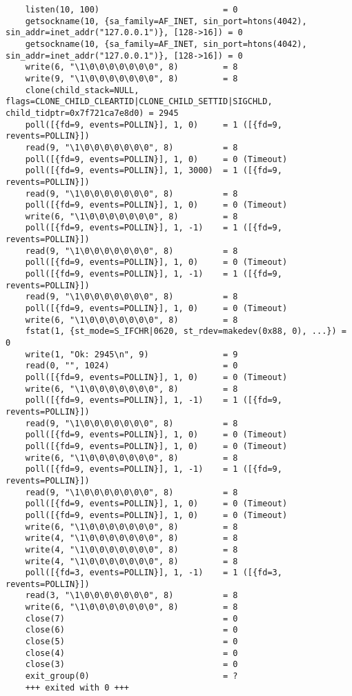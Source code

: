 \documentclass[pdf, unicode, 12pt, a4paper,oneside,fleqn]{article}
\begin{document}
{\begin{verbatim}
    listen(10, 100)                         = 0
    getsockname(10, {sa_family=AF_INET, sin_port=htons(4042), sin_addr=inet_addr("127.0.0.1")}, [128->16]) = 0
    getsockname(10, {sa_family=AF_INET, sin_port=htons(4042), sin_addr=inet_addr("127.0.0.1")}, [128->16]) = 0
    write(6, "\1\0\0\0\0\0\0\0", 8)         = 8
    write(9, "\1\0\0\0\0\0\0\0", 8)         = 8
    clone(child_stack=NULL, flags=CLONE_CHILD_CLEARTID|CLONE_CHILD_SETTID|SIGCHLD, child_tidptr=0x7f721ca7e8d0) = 2945
    poll([{fd=9, events=POLLIN}], 1, 0)     = 1 ([{fd=9, revents=POLLIN}])
    read(9, "\1\0\0\0\0\0\0\0", 8)          = 8
    poll([{fd=9, events=POLLIN}], 1, 0)     = 0 (Timeout)
    poll([{fd=9, events=POLLIN}], 1, 3000)  = 1 ([{fd=9, revents=POLLIN}])
    read(9, "\1\0\0\0\0\0\0\0", 8)          = 8
    poll([{fd=9, events=POLLIN}], 1, 0)     = 0 (Timeout)
    write(6, "\1\0\0\0\0\0\0\0", 8)         = 8
    poll([{fd=9, events=POLLIN}], 1, -1)    = 1 ([{fd=9, revents=POLLIN}])
    read(9, "\1\0\0\0\0\0\0\0", 8)          = 8
    poll([{fd=9, events=POLLIN}], 1, 0)     = 0 (Timeout)
    poll([{fd=9, events=POLLIN}], 1, -1)    = 1 ([{fd=9, revents=POLLIN}])
    read(9, "\1\0\0\0\0\0\0\0", 8)          = 8
    poll([{fd=9, events=POLLIN}], 1, 0)     = 0 (Timeout)
    write(6, "\1\0\0\0\0\0\0\0", 8)         = 8
    fstat(1, {st_mode=S_IFCHR|0620, st_rdev=makedev(0x88, 0), ...}) = 0
    write(1, "Ok: 2945\n", 9)               = 9
    read(0, "", 1024)                       = 0
    poll([{fd=9, events=POLLIN}], 1, 0)     = 0 (Timeout)
    write(6, "\1\0\0\0\0\0\0\0", 8)         = 8
    poll([{fd=9, events=POLLIN}], 1, -1)    = 1 ([{fd=9, revents=POLLIN}])
    read(9, "\1\0\0\0\0\0\0\0", 8)          = 8
    poll([{fd=9, events=POLLIN}], 1, 0)     = 0 (Timeout)
    poll([{fd=9, events=POLLIN}], 1, 0)     = 0 (Timeout)
    write(6, "\1\0\0\0\0\0\0\0", 8)         = 8
    poll([{fd=9, events=POLLIN}], 1, -1)    = 1 ([{fd=9, revents=POLLIN}])
    read(9, "\1\0\0\0\0\0\0\0", 8)          = 8
    poll([{fd=9, events=POLLIN}], 1, 0)     = 0 (Timeout)
    poll([{fd=9, events=POLLIN}], 1, 0)     = 0 (Timeout)
    write(6, "\1\0\0\0\0\0\0\0", 8)         = 8
    write(4, "\1\0\0\0\0\0\0\0", 8)         = 8
    write(4, "\1\0\0\0\0\0\0\0", 8)         = 8
    write(4, "\1\0\0\0\0\0\0\0", 8)         = 8
    poll([{fd=3, events=POLLIN}], 1, -1)    = 1 ([{fd=3, revents=POLLIN}])
    read(3, "\1\0\0\0\0\0\0\0", 8)          = 8
    write(6, "\1\0\0\0\0\0\0\0", 8)         = 8
    close(7)                                = 0
    close(6)                                = 0
    close(5)                                = 0
    close(4)                                = 0
    close(3)                                = 0
    exit_group(0)                           = ?
    +++ exited with 0 +++
\end{verbatim}
}
\end{document}

